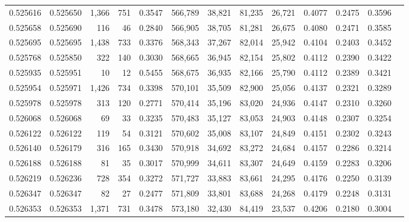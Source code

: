 \begin{tabular}{rrrrrrrrrrrrr}
0.525616 & 0.525650 & 1,366 &   751 &                                     0.3547 & 566,789 &  38,821 &  81,235 &  26,721 & 0.4077 & 0.2475 & 0.3596 \\
0.525658 & 0.525690 &   116 &    46 &                                     0.2840 & 566,905 &  38,705 &  81,281 &  26,675 & 0.4080 & 0.2471 & 0.3585 \\
0.525695 & 0.525695 & 1,438 &   733 &                                     0.3376 & 568,343 &  37,267 &  82,014 &  25,942 & 0.4104 & 0.2403 & 0.3452 \\
0.525768 & 0.525850 &   322 &   140 &                                     0.3030 & 568,665 &  36,945 &  82,154 &  25,802 & 0.4112 & 0.2390 & 0.3422 \\
0.525935 & 0.525951 &    10 &    12 &                                     0.5455 & 568,675 &  36,935 &  82,166 &  25,790 & 0.4112 & 0.2389 & 0.3421 \\
0.525954 & 0.525971 & 1,426 &   734 &                                     0.3398 & 570,101 &  35,509 &  82,900 &  25,056 & 0.4137 & 0.2321 & 0.3289 \\
0.525978 & 0.525978 &   313 &   120 &                                     0.2771 & 570,414 &  35,196 &  83,020 &  24,936 & 0.4147 & 0.2310 & 0.3260 \\
0.526068 & 0.526068 &    69 &    33 &                                     0.3235 & 570,483 &  35,127 &  83,053 &  24,903 & 0.4148 & 0.2307 & 0.3254 \\
0.526122 & 0.526122 &   119 &    54 &                                     0.3121 & 570,602 &  35,008 &  83,107 &  24,849 & 0.4151 & 0.2302 & 0.3243 \\
0.526140 & 0.526179 &   316 &   165 &                                     0.3430 & 570,918 &  34,692 &  83,272 &  24,684 & 0.4157 & 0.2286 & 0.3214 \\
0.526188 & 0.526188 &    81 &    35 &                                     0.3017 & 570,999 &  34,611 &  83,307 &  24,649 & 0.4159 & 0.2283 & 0.3206 \\
0.526219 & 0.526236 &   728 &   354 &                                     0.3272 & 571,727 &  33,883 &  83,661 &  24,295 & 0.4176 & 0.2250 & 0.3139 \\
0.526347 & 0.526347 &    82 &    27 &                                     0.2477 & 571,809 &  33,801 &  83,688 &  24,268 & 0.4179 & 0.2248 & 0.3131 \\
0.526353 & 0.526353 & 1,371 &   731 &                                     0.3478 & 573,180 &  32,430 &  84,419 &  23,537 & 0.4206 & 0.2180 & 0.3004 \\

\end{tabular}
